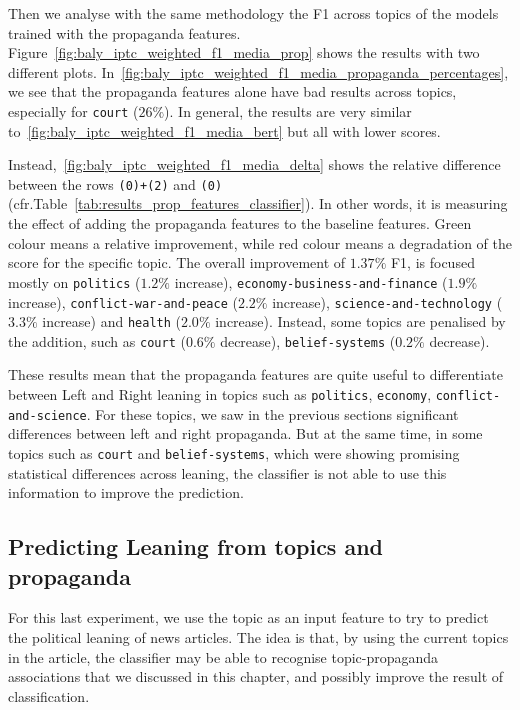 Then we analyse with the same methodology the F1 across topics of the models trained with the propaganda features.
Figure~\ref{fig:baly_iptc_weighted_f1_media_prop} shows the results with two different plots. In~\ref{fig:baly_iptc_weighted_f1_media_propaganda_percentages}, we see that the propaganda features alone have bad results across topics, especially for \texttt{court} ($26\%$). In general, the results are very similar to~\ref{fig:baly_iptc_weighted_f1_media_bert} but all with lower scores.

Instead,~\ref{fig:baly_iptc_weighted_f1_media_delta} shows the relative difference between the rows \texttt{(0)+(2)} and \texttt{(0)} (cfr.Table~\ref{tab:results_prop_features_classifier}).
In other words, it is measuring the effect of adding the propaganda features to the baseline features. Green colour means a relative improvement, while red colour means a degradation of the score for the specific topic.
The overall improvement of $1.37\%$ F1, is focused mostly on \texttt{politics} ($1.2\%$ increase), \texttt{economy-business-and-finance} ($1.9\%$ increase), \texttt{conflict-war-and-peace} ($2.2\%$ increase), \texttt{science-and-technology} ($3.3\%$ increase) and \texttt{health} ($2.0\%$ increase). Instead, some topics are penalised by the addition, such as \texttt{court} ($0.6\%$ decrease), \texttt{belief-systems} ($0.2\%$ decrease).

These results mean that the propaganda features are quite useful to differentiate between Left and Right leaning in topics such as \texttt{politics}, \texttt{economy}, \texttt{conflict-and-science}. For these topics, we saw in the previous sections significant differences between left and right propaganda.
But at the same time, in some topics such as \texttt{court} and \texttt{belief-systems}, which were showing promising statistical differences across leaning, the classifier is not able to use this information to improve the prediction.

\subsection{\statusgreen Predicting Leaning from topics and propaganda}
\label{sec:topic_classifier_propaganda_feature}

For this last experiment, we use the topic as an input feature to try to predict the political leaning of news articles.
%
The idea is that, by using the current topics in the article, the classifier may be able to recognise topic-propaganda associations that we discussed in this chapter, and possibly improve the result of classification.

